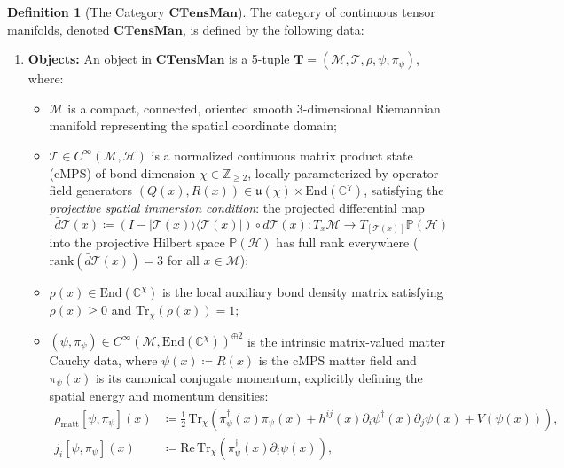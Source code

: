 \documentclass[11pt,a4paper,reqno]{amsart}
\theoremstyle{definition}
\newtheorem{definition}[theorem]{Definition}
\numberwithin{equation}{section}
\newcommand{\CTens}{\mathbf{CTensMan}}
\newcommand{\Tr}{\mathrm{Tr}}
\begin{document}
\begin{definition}[The Category $\CTens$]
The category of continuous tensor manifolds, denoted $\CTens$, is defined by the following data:
\begin{enumerate}[label=(\alph*)]
    \item \textbf{Objects:} An object in $\CTens$ is a 5-tuple $\mathbf{T} = (\mathcal{M}, \mathcal{T}, \rho, \psi, \pi_\psi)$, where:
    \begin{itemize}
        \item $\mathcal{M}$ is a compact, connected, oriented smooth 3-dimensional Riemannian manifold representing the spatial coordinate domain;
        \item $\mathcal{T} \in C^\infty(\mathcal{M}, \mathcal{H})$ is a normalized continuous matrix product state (cMPS) of bond dimension $\chi \in \mathbb{Z}_{\ge 2}$, locally parameterized by operator field generators $(Q(x), R(x)) \in \mathfrak{u}(\chi) \times \mathrm{End}(\mathbb{C}^\chi)$, satisfying the \emph{projective spatial immersion condition}: the projected differential map
        \begin{equation}
            \bar{d}\mathcal{T}(x) \coloneqq (I - |\mathcal{T}(x)\rangle\langle\mathcal{T}(x)|) \circ d\mathcal{T}(x) : T_x\mathcal{M} \longrightarrow T_{[\mathcal{T}(x)]}\mathbb{P}(\mathcal{H}) \label{eq:projected_immersion}
        \end{equation}
        into the projective Hilbert space $\mathbb{P}(\mathcal{H})$ has full rank everywhere ($\mathrm{rank}(\bar{d}\mathcal{T}(x)) = 3$ for all $x \in \mathcal{M}$);
        \item $\rho(x) \in \mathrm{End}(\mathbb{C}^\chi)$ is the local auxiliary bond density matrix satisfying $\rho(x) \ge 0$ and $\Tr_\chi(\rho(x)) = 1$;
        \item $(\psi, \pi_\psi) \in C^\infty(\mathcal{M}, \mathrm{End}(\mathbb{C}^\chi))^{\oplus 2}$ is the intrinsic matrix-valued matter Cauchy data, where $\psi(x) \coloneqq R(x)$ is the cMPS matter field and $\pi_\psi(x)$ is its canonical conjugate momentum, explicitly defining the spatial energy and momentum densities:
        \begin{align}
            \rho_{\mathrm{matt}}[\psi, \pi_\psi](x) &\coloneqq \frac{1}{2} \, \mathrm{Tr}_\chi \left( \pi_\psi^\dagger(x) \pi_\psi(x) + h^{ij}(x) \partial_i \psi^\dagger(x) \partial_j \psi(x) + V(\psi(x)) \right), \label{eq:rho_matt_def} \\
            j_i[\psi, \pi_\psi](x) &\coloneqq \mathrm{Re} \, \mathrm{Tr}_\chi \left( \pi_\psi^\dagger(x) \partial_i \psi(x) \right), \label{eq:j_i_def}

\end{align}
\end{itemize}
\end{enumerate}
\end{definition}
\end{document}
